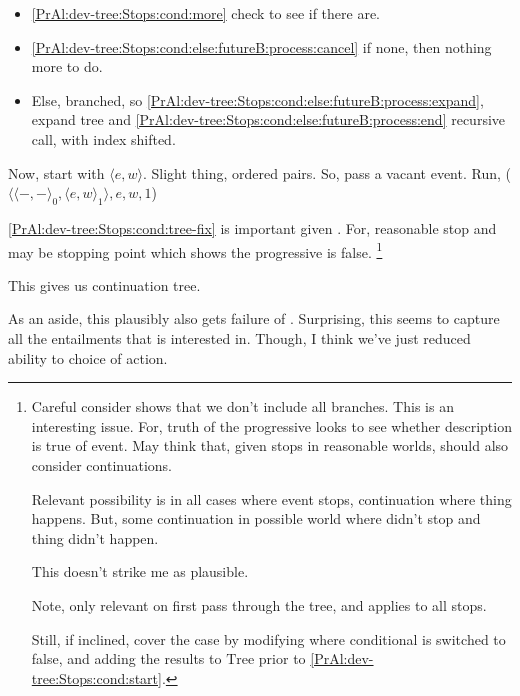 \begin{note}
\begin{itemize}
\begin{itemize}
\begin{itemize}
\begin{itemize}
        \item
          \autoref{PrAl:dev-tree:Stops:cond:more} check to see if there are.
        \item
          \autoref{PrAl:dev-tree:Stops:cond:else:futureB:process:cancel} if none, then nothing more to do.
        \item
          Else, branched, so \autoref{PrAl:dev-tree:Stops:cond:else:futureB:process:expand}, expand tree and \autoref{PrAl:dev-tree:Stops:cond:else:futureB:process:end} recursive call, with index shifted.
        \end{itemize}
      \end{itemize}
    \end{itemize}
  \end{itemize}
  Now, start with \(\langle e,w \rangle\).
  Slight thing, ordered pairs.
  So, pass a vacant event.
  Run, \AlgDevelopTree{}(\(\langle \langle -,- \rangle_{0}, \langle e,w \rangle_{1} \rangle, e, w, 1\))
\end{note}

\begin{note}
  \autoref{PrAl:dev-tree:Stops:cond:tree-fix} is important given \AlgGetPStops{}.
  For, reasonable stop and may be stopping point which shows the progressive is false.%
  \footnote{
    Careful consider shows that we don't include all branches.
    This is an interesting issue.
    For, truth of the progressive looks to see whether description is true of event.
    May think that, given stops in reasonable worlds, should also consider continuations.

    Relevant possibility is in all cases where event stops, continuation where thing happens.
    But, some continuation in possible world where didn't stop and thing didn't happen.

    This doesn't strike me as plausible.

    Note, only relevant on first pass through the tree, and \AlgAC{} applies to all stops.

    Still, if inclined, cover the case by modifying \AlgGetPStops{} where conditional is switched to false, and adding the results to \(\text{Tree}\) prior to \autoref{PrAl:dev-tree:Stops:cond:start}.
    }
\end{note}

\begin{note}
  This gives us continuation tree.
  
  As an aside, this plausibly also gets failure of \BoyVS{}.
  Surprising, this seems to capture all the entailments that \citeauthor{Boylan:2020aa} is interested in.
  Though, I think we've just reduced ability to choice of action.
\end{note}

